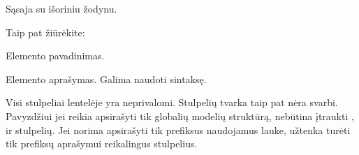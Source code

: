 \documentclass[letterpaper,10pt,lithuanian]{sphinxmanual}
\begin{document}

\begin{fulllineitems}
\label{\detokenize{formatas:uri}}
\pysigstartsignatures
\pysigline
{}
\pysigstopsignatures
\sphinxAtStartPar
{}

\sphinxAtStartPar
Sąsaja su išoriniu žodynu.


\begin{sphinxseealso}{Taip pat žiūrėkite:}

\sphinxAtStartPar
{\hyperref[\detokenize{zodynai:vocab}]{}}


\end{sphinxseealso}


\end{fulllineitems}


\begin{fulllineitems}
\label{\detokenize{formatas:title}}
\pysigstartsignatures
\pysigline
{}
\pysigstopsignatures
\sphinxAtStartPar
{}

\sphinxAtStartPar
Elemento pavadinimas.

\end{fulllineitems}


\begin{fulllineitems}
\label{\detokenize{formatas:description}}
\pysigstartsignatures
\pysigline
{}
\pysigstopsignatures
\sphinxAtStartPar
{}

\sphinxAtStartPar
Elemento aprašymas. Galima naudoti  sintaksę.

\end{fulllineitems}


\sphinxAtStartPar
Visi stulpeliai lentelėje yra neprivalomi. Stulpelių tvarka taip pat nėra
svarbi. Pavyzdžiui jei reikia apsirašyti tik globalių modelių struktūrą,
nebūtina įtraukti {\hyperref[\detokenize{formatas:dataset}]{}}, {\hyperref[\detokenize{formatas:resource}]{}} ir {\hyperref[\detokenize{formatas:base}]{}} stulpelių.
Jei norima apsirašyti tik prefiksus naudojamus {\hyperref[\detokenize{formatas:uri}]{}} lauke, užtenka
turėti tik prefiksų aprašymui reikalingus stulpelius.
\end{document}
